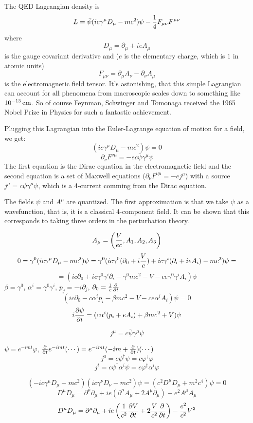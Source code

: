 The QED Lagrangian density is
$$L=\bar\psi(ic\gamma^\mu D_\mu-mc^2)\psi-{1\over4}F_{\mu\nu}F^{\mu\nu}$$
where
$$D_\mu=\partial_\mu+ieA_\mu$$
is the gauge covariant derivative and ($e$ is the elementary charge, which is
$1$ in atomic units)
$$F_{\mu\nu}=\partial_\mu A_\nu-\partial_\nu A_\mu$$
is the electromagnetic field tensor. It's astonishing, that this simple
Lagrangian can account for all phenomena from macroscopic scales down to
something like $10^{-13}\rm\,cm$. So of course Feynman, Schwinger and Tomonaga
received the 1965 Nobel Prize in Physics for such a fantastic achievement.

Plugging this Lagrangian into the Euler-Lagrange equation of motion for a
field, we get:
$$(ic\gamma^\mu D_\mu-mc^2)\psi=0$$
$$\partial_\nu F^{\nu\mu}=-ec\bar\psi\gamma^\mu\psi$$
The first equation is the Dirac equation in the electromagnetic field and
the second equation is a set of Maxwell equations ($\partial_\nu
F^{\nu\mu}=-ej^\mu$) with a source $j^\mu=c\bar\psi\gamma^\mu\psi$, which is a
4-current comming from the Dirac equation.

The fields $\psi$ and $A^\mu$ are quantized. The first approximation is that we
take $\psi$ as a wavefunction, that is, it is a classical 4-component field. It
can be shown that this corresponds to taking three orders in the perturbation
theory.

$$A_\mu=\left({V\over ec},A_1,A_2,A_3\right)$$
$$0=\gamma^0(ic\gamma^\mu D_\mu-mc^2)\psi=
\gamma^0(ic\gamma^0(\partial_0+i{V\over c})+ic\gamma^i
(\partial_i+ieA_i)-mc^2)\psi=$$
$$=
(ic\partial_0+ic\gamma^0\gamma^i\partial_i-\gamma^0mc^2-V
-ce\gamma^0\gamma^iA_i)\psi
$$
$\beta=\gamma^0$, $\alpha^i=\gamma^0\gamma^i$, $p_j=-i\partial_j$,
$\partial_0={1\over c}{\partial\over\partial t}$
$$ (ic\partial_0-c\alpha^i p_i-\beta mc^2-V-ce\alpha^iA_i)\psi=0 $$
$$ i{\partial\psi\over\partial t}=(c\alpha^i(p_i+eA_i)+\beta mc^2+V)\psi $$

$$j^\mu=c\bar\psi\gamma^\mu\psi$$

$\psi=e^{-imt}\varphi$, ${\partial\over\partial t}e^{-imt}(\cdots)=
e^{-imt}(-im+{\partial\over\partial t})(\cdots)$
$$j^0=c\psi^\dagger\psi=c\varphi^\dagger\varphi$$
$$j^i=c\psi^\dagger\alpha^i\psi=c\varphi^\dagger\alpha^i\varphi$$

$$(-ic\gamma^\mu D_\mu-mc^2)(ic\gamma^\nu D_\nu-mc^2)\psi=
(c^2D^\mu D_\mu+m^2c^4)\psi=0$$
$$D^\mu D_\mu=\partial^\mu\partial_\mu+ie(\partial^\mu
A_\mu+2A^\mu\partial_\mu) -e^2A^\mu A_\mu$$
$$D^\mu D_\mu=\partial^\mu\partial_\mu
+ie\left({1\over c^2}{\partial V\over\partial t}+
2{V\over c^2}{\partial\over\partial t}\right) -{e^2\over c^2}V^2$$

